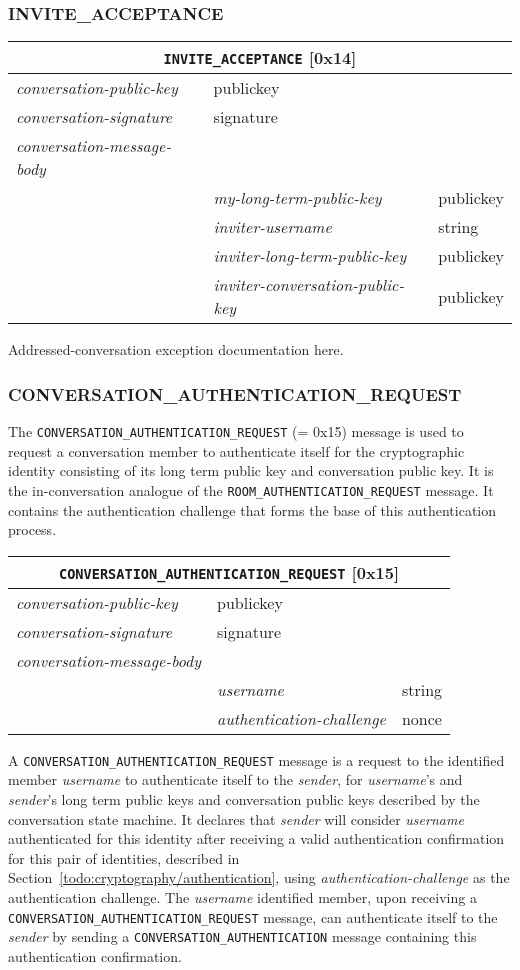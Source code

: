 \documentclass{article}
\def\message#1{\texttt{#1}}
\def\field#1{\textit{#1}}
\newenvironment{conversationmessage}[2]{
\newcommand{\messagefield}[2]{
& \field{##1} & \textsf{##2} \\
\hline
}
\begin{tabular}{|l|l|l|}
\hline
\multicolumn{3}{|c|}{\message{#1} [#2]} \\
\hline
\hline
\field{conversation-public-key} & \multicolumn{2}{l|}{\textsf{publickey}} \\
\hline
\field{conversation-signature} & \multicolumn{2}{l|}{\textsf{signature}} \\
\hline
\field{conversation-message-body} & \multicolumn{2}{l|}{} \\
\hline
}{
\end{tabular}
}
\begin{document}
\subsubsection{INVITE\_ACCEPTANCE}
\label{sec:messages/invite-acceptance}

\begin{conversationmessage}{INVITE\_ACCEPTANCE}{0x14}
\messagefield{my-long-term-public-key}{publickey}
\messagefield{inviter-username}{string}
\messagefield{inviter-long-term-public-key}{publickey}
\messagefield{inviter-conversation-public-key}{publickey}
\end{conversationmessage}

Addressed-conversation exception documentation here.

\subsubsection{CONVERSATION\_AUTHENTICATION\_REQUEST}

The \message{CONVERSATION\_AUTHENTICATION\_REQUEST} (= 0x15) message is used to request a conversation member to authenticate itself for the cryptographic identity consisting of its long term public key and conversation public key.
It is the in-conversation analogue of the \message{ROOM\_AUTHENTICATION\_REQUEST} message.
It contains the authentication challenge that forms the base of this authentication process.

\begin{conversationmessage}{CONVERSATION\_AUTHENTICATION\_REQUEST}{0x15}
\messagefield{username}{string}
\messagefield{authentication-challenge}{nonce}
\end{conversationmessage}

A \message{CONVERSATION\_AUTHENTICATION\_REQUEST} message is a request to the identified member \field{username} to authenticate itself to the \field{sender}, for \field{username}'s and \field{sender}'s long term public keys and conversation public keys described by the conversation state machine.
It declares that \field{sender} will consider \field{username} authenticated for this identity after receiving a valid authentication confirmation for this pair of identities, described in Section~\ref{todo:cryptography/authentication}, using \field{authentication-challenge} as the authentication challenge.
The \field{username} identified member, upon receiving a \message{CONVERSATION\_AUTHENTICATION\_REQUEST} message, can authenticate itself to the \field{sender} by sending a \message{CONVERSATION\_AUTHENTICATION} message containing this authentication confirmation.
\end{document}
